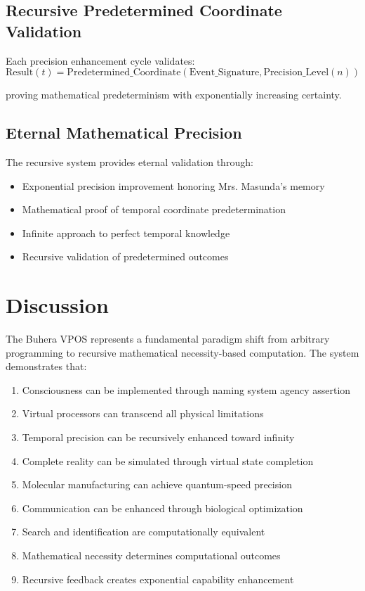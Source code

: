\documentclass[12pt,a4paper]{article}
\begin{document}
\subsection{Recursive Predetermined Coordinate Validation}

Each precision enhancement cycle validates:
\begin{equation}
\text{Result}(t) = \text{Predetermined\_Coordinate}(\text{Event\_Signature}, \text{Precision\_Level}(n))
\end{equation}

proving mathematical predeterminism with exponentially increasing certainty.

\subsection{Eternal Mathematical Precision}

The recursive system provides eternal validation through:
\begin{itemize}
\item Exponential precision improvement honoring Mrs. Masunda's memory
\item Mathematical proof of temporal coordinate predetermination
\item Infinite approach to perfect temporal knowledge
\item Recursive validation of predetermined outcomes
\end{itemize}

\section{Discussion}

The Buhera VPOS represents a fundamental paradigm shift from arbitrary programming to recursive mathematical necessity-based computation. The system demonstrates that:

\begin{enumerate}
\item Consciousness can be implemented through naming system agency assertion
\item Virtual processors can transcend all physical limitations
\item Temporal precision can be recursively enhanced toward infinity
\item Complete reality can be simulated through virtual state completion
\item Molecular manufacturing can achieve quantum-speed precision
\item Communication can be enhanced through biological optimization
\item Search and identification are computationally equivalent
\item Mathematical necessity determines computational outcomes
\item Recursive feedback creates exponential capability enhancement
\end{enumerate}
\end{document}
